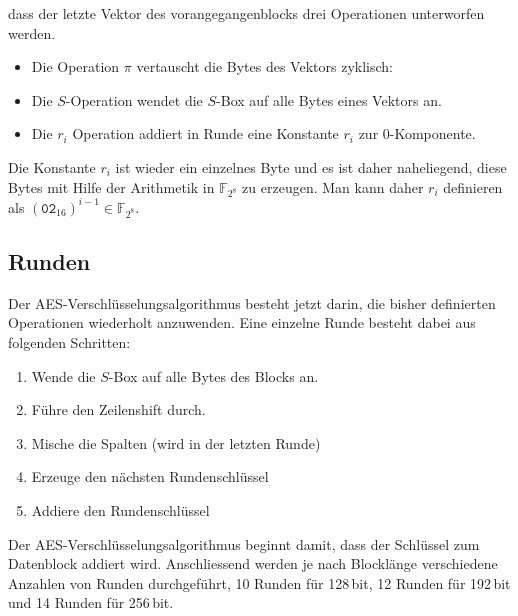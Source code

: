 dass der letzte Vektor des vorangegangenblocks drei Operationen
unterworfen werden.
\begin{itemize}
\item
Die Operation $\pi$ vertauscht die Bytes des Vektors zyklisch:
\begin{center}
\end{center}
\item
Die $S$-Operation wendet die $S$-Box auf alle Bytes eines Vektors an.
\item
Die $r_i$ Operation addiert in Runde eine Konstante $r_i$ zur $0$-Komponente.
\end{itemize}
Die Konstante $r_i$ ist wieder ein einzelnes Byte und es ist daher
naheliegend, diese Bytes mit Hilfe der Arithmetik in $\mathbb{F}_{2^8}$
zu erzeugen.
Man kann daher $r_i$ definieren als
$(\texttt{02}_{16})^{i-1}\in\mathbb{F}_{2^8}$.

\subsection{Runden}
Der AES-Verschlüsselungsalgorithmus besteht jetzt darin, die bisher
definierten Operationen wiederholt anzuwenden.
Eine einzelne Runde besteht dabei aus folgenden Schritten:
\begin{enumerate}
\item Wende die $S$-Box auf alle Bytes des Blocks an.
\item Führe den Zeilenshift durch.
\item Mische die Spalten (wird in der letzten Runde)
\item Erzeuge den nächsten Rundenschlüssel
\item Addiere den Rundenschlüssel
\end{enumerate}
Der AES-Verschlüsselungsalgorithmus beginnt damit, dass der Schlüssel
zum Datenblock addiert wird.
Anschliessend werden je nach Blocklänge verschiedene Anzahlen von
Runden durchgeführt, 10 Runden für 128\,bit, 12 Runden für 192\,bit und
14 Runden für 256\,bit.





